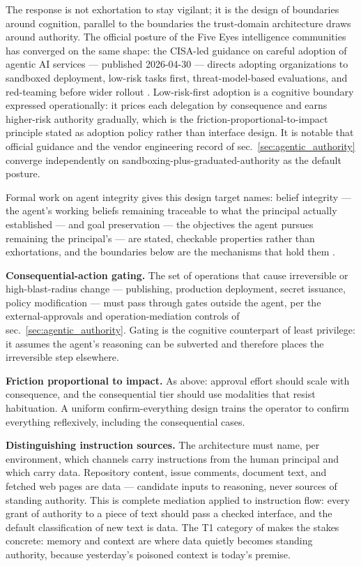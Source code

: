 \documentclass[
  english,
  9pt,
]{extarticle}
\begin{document}
The response is not exhortation to stay vigilant; it is the design of
boundaries around cognition, parallel to the boundaries the trust-domain
architecture draws around authority. The official posture of the Five
Eyes intelligence communities has converged on the same shape: the
CISA-led guidance on careful adoption of agentic AI services ---
published 2026-04-30 --- directs adopting organizations to sandboxed
deployment, low-risk tasks first, threat-model-based evaluations, and
red-teaming before wider rollout \citep{cisa_agentic_guidance}.
Low-risk-first adoption is a cognitive boundary expressed operationally:
it prices each delegation by consequence and earns higher-risk authority
gradually, which is the friction-proportional-to-impact principle stated
as adoption policy rather than interface design. It is notable that
official guidance and the vendor engineering record of
sec.~\ref{sec:agentic_authority} converge independently on
sandboxing-plus-graduated-authority as the default posture.

Formal work on agent integrity gives this design target names: belief
integrity --- the agent's working beliefs remaining traceable to what
the principal actually established --- and goal preservation --- the
objectives the agent pursues remaining the principal's --- are stated,
checkable properties rather than exhortations, and the boundaries below
are the mechanisms that hold them \citep{cif_formal_2026}.

\textbf{Consequential-action gating.} The set of operations that cause
irreversible or high-blast-radius change --- publishing, production
deployment, secret issuance, policy modification --- must pass through
gates outside the agent, per the external-approvals and
operation-mediation controls of sec.~\ref{sec:agentic_authority}. Gating
is the cognitive counterpart of least privilege: it assumes the agent's
reasoning can be subverted and therefore places the irreversible step
elsewhere.

\textbf{Friction proportional to impact.} As above: approval effort
should scale with consequence, and the consequential tier should use
modalities that resist habituation. A uniform confirm-everything design
trains the operator to confirm everything reflexively, including the
consequential cases.

\textbf{Distinguishing instruction sources.} The architecture must name,
per environment, which channels carry instructions from the human
principal and which carry data. Repository content, issue comments,
document text, and fetched web pages are data --- candidate inputs to
reasoning, never sources of standing authority. This is complete
mediation \citep{saltzer1975} applied to instruction flow: every grant
of authority to a piece of text should pass a checked interface, and the
default classification of new text is data. The T1 category of
\citep{owasp_agentic_top10} makes the stakes concrete: memory and
context are where data quietly becomes standing authority, because
yesterday's poisoned context is today's premise.
\end{document}
